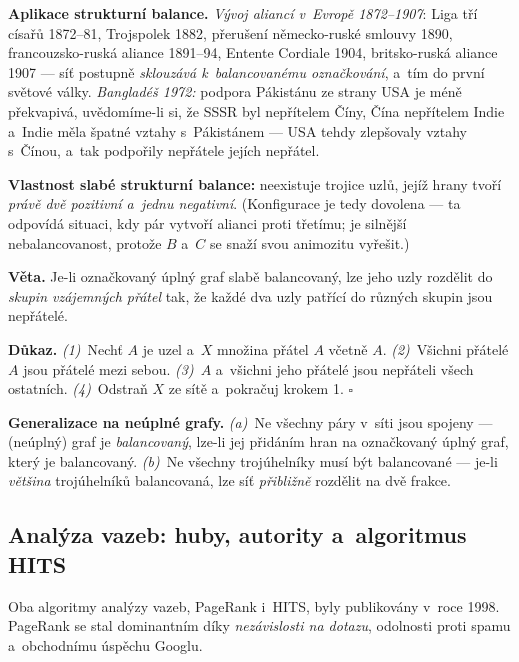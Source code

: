 \documentclass[11pt,a4paper]{article}
\theoremstyle{definition}
\begin{document}
\textbf{Aplikace strukturní balance.} \emph{Vývoj aliancí v~Evropě 1872--1907}: Liga tří císařů
1872--81, Trojspolek 1882, přerušení německo-ruské smlouvy 1890, francouzsko-ruská aliance
1891--94, Entente Cordiale 1904, britsko-ruská aliance 1907 --- síť postupně \emph{sklouzává
k~balancovanému označkování}, a~tím do první světové války. \emph{Bangladéš 1972:} podpora
Pákistánu ze strany USA je méně překvapivá, uvědomíme-li si, že SSSR byl nepřítelem Číny, Čína
nepřítelem Indie a~Indie měla špatné vztahy s~Pákistánem --- USA tehdy zlepšovaly vztahy
s~Čínou, a~tak podpořily nepřátele jejích nepřátel.

\begin{defbox}
\textbf{Vlastnost slabé strukturní balance:} neexistuje trojice uzlů, jejíž hrany tvoří
\emph{právě dvě pozitivní a~jednu negativní}. (Konfigurace  je tedy dovolena
--- ta odpovídá situaci, kdy pár vytvoří alianci proti třetímu;  je silnější nebalancovanost, protože $B$ a~$C$ se snaží svou animozitu vyřešit.)

\textbf{Věta.} Je-li označkovaný úplný graf slabě balancovaný, lze jeho uzly rozdělit do
\emph{skupin vzájemných přátel} tak, že každé dva uzly patřící do různých skupin jsou
nepřátelé.

\textbf{Důkaz.} \emph{(1)}~Nechť $A$ je uzel a~$X$ množina přátel $A$ včetně $A$.
\emph{(2)}~Všichni přátelé $A$ jsou přátelé mezi sebou. \emph{(3)}~$A$ a~všichni jeho přátelé
jsou nepřáteli všech ostatních. \emph{(4)}~Odstraň $X$ ze sítě a~pokračuj krokem 1. $\square$

\textbf{Generalizace na neúplné grafy.} \emph{(a)}~Ne všechny páry v~síti jsou spojeny ---
(neúplný) graf je \emph{balancovaný}, lze-li jej  přidáním hran na
označkovaný úplný graf, který je balancovaný. \emph{(b)}~Ne všechny trojúhelníky musí být
balancované --- je-li \emph{většina} trojúhelníků balancovaná, lze síť \emph{přibližně}
rozdělit na dvě frakce.
\end{defbox}

\subsection{Analýza vazeb: huby, autority a~algoritmus HITS}

Oba algoritmy analýzy vazeb, PageRank i~HITS, byly publikovány v~roce 1998. PageRank se stal
dominantním díky \emph{nezávislosti na dotazu}, odolnosti proti spamu a~obchodnímu úspěchu
Googlu.
\end{document}
